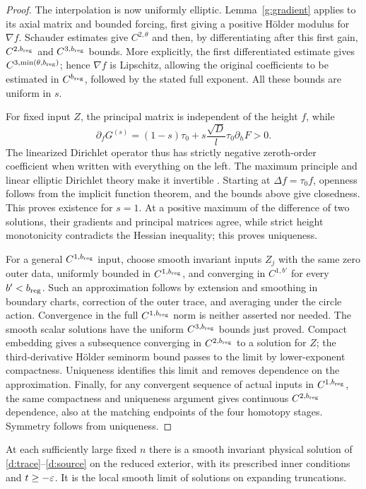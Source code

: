 \begin{proof}
The interpolation is now uniformly elliptic.  Lemma~\ref{g:gradient}
applies to its axial matrix and bounded forcing, first giving a
positive H\"older modulus for $\nabla f$.  Schauder estimates give
$C^{2,\theta}$ and then, by differentiating after this first gain,
$C^{2,b_{\rm reg}}$ and $C^{3,b_{\rm reg}}$ bounds.  More explicitly,
the first differentiated estimate gives $C^{3,\min(\theta,b_{\rm reg})}$;
hence $\nabla f$ is Lipschitz, allowing the original coefficients to
be estimated in $C^{b_{\rm reg}}$, followed by the stated full
exponent.  All these bounds are uniform in $s$.

For fixed input $Z$, the principal matrix is independent of the
height $f$, while
\[
 \partial_fG^{(s)}
 =(1-s)\tau_0+s\frac{\sqrt D}{l}\tau_0\partial_hF>0.
\]
The linearized Dirichlet operator thus has strictly negative
zeroth-order coefficient when written with everything on the left.
The maximum principle and linear elliptic Dirichlet theory make it
invertible \cite{GilbargTrudinger2001}.  Starting at
$\Delta f=\tau_0f$, openness follows from the implicit function
theorem, and the bounds above give closedness.  This proves existence
for $s=1$.  At a positive maximum of the difference of two solutions,
their gradients and principal matrices agree, while strict height
monotonicity contradicts the Hessian inequality; this proves
uniqueness.

For a general $C^{1,b_{\rm reg}}$ input, choose smooth invariant
inputs $Z_j$ with the same zero outer data, uniformly bounded in
$C^{1,b_{\rm reg}}$, and converging in $C^{1,b'}$ for every
$b'<b_{\rm reg}$.  Such an approximation follows by extension and
smoothing in boundary charts, correction of the outer trace, and
averaging under the circle action.  Convergence in the full
$C^{1,b_{\rm reg}}$ norm is neither asserted nor needed.  The smooth
scalar solutions have the uniform $C^{3,b_{\rm reg}}$ bounds just
proved.  Compact embedding gives a subsequence converging in
$C^{2,b_{\rm reg}}$ to a solution for $Z$; the third-derivative
H\"older seminorm bound passes to the limit by lower-exponent
compactness.  Uniqueness identifies this limit and removes dependence
on the approximation.  Finally, for any convergent sequence of
actual inputs in $C^{1,b_{\rm reg}}$, the same compactness and
uniqueness argument gives continuous $C^{2,b_{\rm reg}}$ dependence,
also at the matching endpoints of the four homotopy stages.
Symmetry follows from uniqueness.
\end{proof}

\begin{proposition}\label{e:existence}
At each sufficiently large fixed $n$ there is a smooth invariant
physical solution of \eqref{d:trace}--\eqref{d:source} on the reduced
exterior, with its prescribed inner conditions and $t\ge-\varepsilon$.
It is the local smooth limit of solutions on expanding truncations.
\end{proposition}

